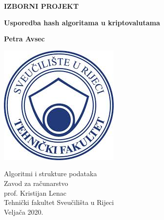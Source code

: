 \documentclass[11pt]{article}
\begin{document}
\begin{titlepage}
	\begin{center}
		\vspace*{1cm}
		
		\LARGE
		\textbf{IZBORNI PROJEKT} 
		
		\vspace{0.5cm}
		\LARGE
		\textbf{Usporedba hash algoritama u kriptovalutama} 
		
		\vspace{1.5cm}
		
		\Large
		\textbf{Petra Avsec}
		
		\vfill
		
		\textsl{}
		\vspace{0.8cm}
		
		\includegraphics[scale=0.5,keepaspectratio]{slike/riteh}
		
		\Large
		Algoritmi i strukture podataka \\
		Zavod za računarstvo\\
		prof. Kristijan Lenac \\
		Tehnički fakultet Sveučilišta u Rijeci \\
		Veljača 2020. 
		
		
	\end{center}
\end{titlepage}

\tableofcontents

\listoffigures

\pagebreak

\section{}
	
\end{document}
